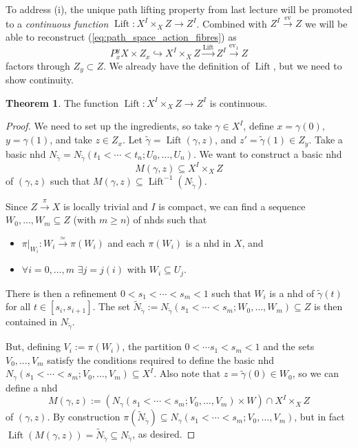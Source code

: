 \documentclass{tufte-handout}
\def\into {\hookrightarrow}
\DeclareMathOperator{\ev}{ev}
\DeclareMathOperator{\Lift}{Lift}
\theoremstyle{definition}
\newtheorem{theorem}{Theorem}
\begin{document}
To address (i), the unique path lifting property from last lecture will be promoted to a
\emph{continuous function} $\Lift\colon X^I\times_X Z \to Z^I$. Combined with $Z^I \xrightarrow{\ev} Z$
we will be able to reconstruct (\ref{eq:path_space_action_fibres}) as
\[
P_x^y X \times Z_x \into X^I \times_X Z \xrightarrow{\Lift} Z^I \xrightarrow{\ev_1} Z
\]
factors through $Z_y \subset Z$. We already have the definition of $\Lift$, but we need to show 
continuity.

\begin{theorem}
The function $\Lift\colon X^I\times_X Z \to Z^I$ is continuous.
\end{theorem}

\begin{proof}
We need to set up the ingredients, so take $\gamma \in X^I$, 
define $x=\gamma(0)$, $y=\gamma(1)$, and take $z\in Z_x$.
Let $\widetilde{\gamma} = \Lift(\gamma,z)$, and $z'=\widetilde{\gamma}(1)\in Z_y$.
Take a basic nhd $N_{\widetilde{\gamma}} = N_{\widetilde{\gamma}}(t_1 < \cdots<t_n;U_0,\ldots, U_n)$.
We want to construct a basic nhd
\[
M(\gamma,z) \subseteq X^I \times_X Z
\]
of $(\gamma,z)$ such that $M(\gamma,z) \subseteq \Lift^{-1}(N_{\widetilde{\gamma}})$.

Since $Z\xrightarrow{\pi} X$ is locally trivial and $I$ is compact, we can find a sequence $W_0,\ldots,W_m\subseteq Z$ (with $m\geq n$) of nhds such that
\begin{itemize}
	\item $\pi\big|_{W_i} \colon W_i \xrightarrow{\simeq} \pi(W_i)$ and each $\pi(W_i)$ is a nhd in $X$, and
	\item $\forall i=0,\ldots, m$ $\exists j=j(i)$ with $W_i \subseteq U_j$.
\end{itemize}

There is then a refinement $0<s_1<\cdots<s_m < 1$ such that $W_i$ is a nhd of $\widetilde{\gamma}(t)$ for all $t\in[s_i,s_{i+1}]$.
The set $\widetilde{N}_{\widetilde{\gamma}} := N_{\widetilde{\gamma}}(s_1<\cdots<s_m;W_0,\ldots,W_m) \subseteq Z$ is then contained in $N_{\widetilde{\gamma}}$.

But, defining $V_i := \pi(W_i)$, the partition $0<\cdots s_1 <s_m<1$ and the sets $V_0,\ldots,V_m$ satisfy the conditions required to define the basic nhd $N_\gamma(s_1<\cdots<s_m;V_0,\ldots, V_m)\subseteq X^I$. Also note that $z=\widetilde{\gamma}(0) \in W_0$, so we can define a nhd
\[
M(\gamma,z):= \left(N_\gamma(s_1<\cdots<s_m;V_0,\ldots, V_m)\times W \right) \cap X^I \times_X Z
\]
of $(\gamma,z)$. By construction $\pi(\widetilde{N}_{\widetilde{\gamma}}) \subseteq N_\gamma(s_1<\cdots<s_m;V_0,\ldots, V_m)$, but in fact $\Lift(M(\gamma,z)) = \widetilde{N}_{\widetilde{\gamma}} \subseteq N_{\widetilde{\gamma}}$, as desired.
\end{proof}
\end{document}
